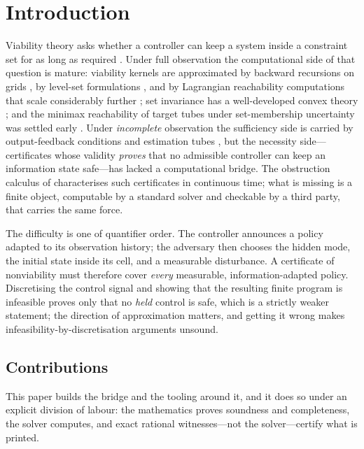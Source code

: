 \section{Introduction}\label{sec:intro}

Viability theory asks whether a controller can keep a system inside a constraint set for as long as required \cite{Aubin1991}. Under full observation the computational side of that question is mature: viability kernels are approximated by backward recursions on grids \cite{SaintPierre1994}, by level-set formulations \cite{MitchellBayenTomlin2005}, and by Lagrangian reachability computations that scale considerably further \cite{Maidens2013}; set invariance has a well-developed convex theory \cite{Blanchini1999}; and the minimax reachability of target tubes under set-membership uncertainty was settled early \cite{BertsekasRhodes1971}. Under \emph{incomplete} observation the sufficiency side is carried by output-feedback conditions and estimation tubes \cite{Veliov1993}, but the necessity side---certificates whose validity \emph{proves} that no admissible controller can keep an information state safe---has lacked a computational bridge. The obstruction calculus of \cite{Abaee2026calc} characterises such certificates in continuous time; what is missing is a finite object, computable by a standard solver and checkable by a third party, that carries the same force.

The difficulty is one of quantifier order. The controller announces a policy adapted to its observation history; the adversary then chooses the hidden mode, the initial state inside its cell, and a measurable disturbance. A certificate of nonviability must therefore cover \emph{every} measurable, information-adapted policy. Discretising the control signal and showing that the resulting finite program is infeasible proves only that no \emph{held} control is safe, which is a strictly weaker statement; the direction of approximation matters, and getting it wrong makes infeasibility-by-discretisation arguments unsound.

\subsection{Contributions}

This paper builds the bridge and the tooling around it, and it does so under an explicit division of labour: the mathematics proves soundness and completeness, the solver computes, and exact rational witnesses---not the solver---certify what is printed.

